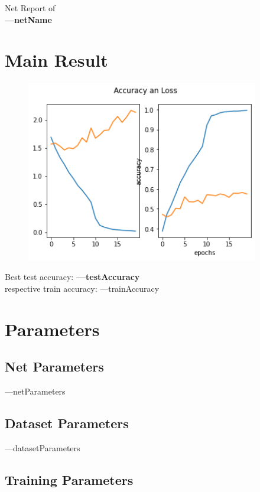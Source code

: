 \documentclass[12pt]{article}
\begin{document}
\begin{center}
    \Large{Net Report of  \\
    \textbf{---netName}}
\end{center}

\section{Main Result}
\begin{figure}[H]
    \centering
    \includegraphics[width = 4in]{src/acc_plot.png}
\end{figure}
\begin{center}
    \large {Best test accuracy: \textbf{---testAccuracy}} \\
    \large {respective train accuracy: ---trainAccuracy} \\
\end{center}
\section{Parameters}
\subsection{Net Parameters}

    ---netParameters

\subsection{Dataset Parameters}

    ---datasetParameters

\subsection{Training Parameters}
\end{document}
